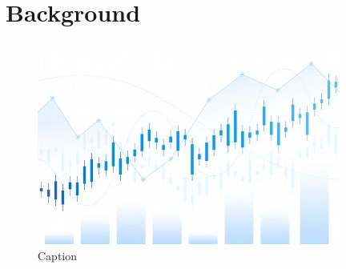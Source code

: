 \chapter{Background}

\begin{figure}[h]
    \centering
    \includegraphics[width=0.5\linewidth]{images/image.jpeg}
    \caption{Caption}
    \label{fig:enter-label}
\end{figure}
